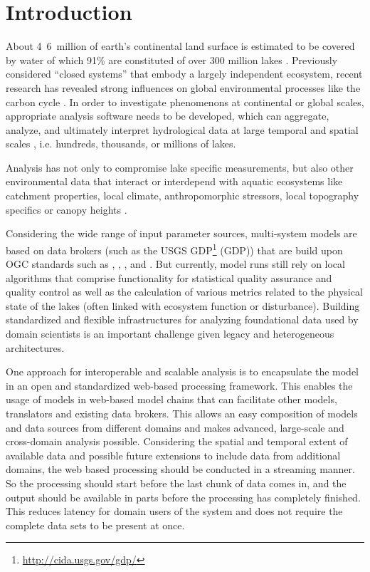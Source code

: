 
\chapter{Introduction}

About \unit{4.6 million}{\kilo\square\metre} of earth's continental land surface is estimated to be covered by water of which 91\% are constituted of over 300 million lakes \citep{downing2006global}. Previously considered ``closed systems'' that embody a largely independent ecosystem, recent research has revealed strong influences on global environmental processes like the carbon cycle \citep{cole2007plumbing}. In order to investigate phenomenons at continental or global scales, appropriate analysis software needs to be developed, which can aggregate, analyze, and ultimately interpret hydrological data at large temporal and spatial scales \citep{read2013upscaling}, i.e. hundreds, thousands, or millions of lakes.

Analysis has not only to compromise lake specific measurements, but also other environmental data that interact or interdepend with aquatic ecosystems like catchment properties, local climate, anthropomorphic stressors, local topography specifics or canopy heights \citep{read2013upscaling}.

Considering the wide range of input parameter sources, multi-system models are based on data brokers (such as the \ac{USGS} \acl{GDP}\footnote{\url{http://cida.usgs.gov/gdp/} \lastretrievedp} (\acs{GDP})) that are build upon \ac{OGC} standards such as , , ,  and . But currently, model runs still rely on local algorithms that comprise functionality for statistical quality assurance and quality control as well as the calculation of various metrics related to the physical state of the lakes (often linked with ecosystem function or disturbance). Building standardized and flexible infrastructures for analyzing foundational data used by domain scientists is an important challenge given legacy and heterogeneous architectures.

One approach for interoperable and scalable analysis is to encapsulate the model in an open and standardized web-based processing framework. This enables the usage of models in web-based model chains that can facilitate other models, translators and existing data brokers. This allows an easy composition of models and data sources from different domains and makes advanced, large-scale and cross-domain analysis possible. Considering the spatial and temporal extent of available data and possible future extensions to include data from additional domains, the web based processing should be conducted in a streaming manner. So the processing should start before the last chunk of data comes in, and the output should be available in parts before the processing has completely finished. This reduces latency for domain users of the system and does not require the complete data sets to be present at once.


